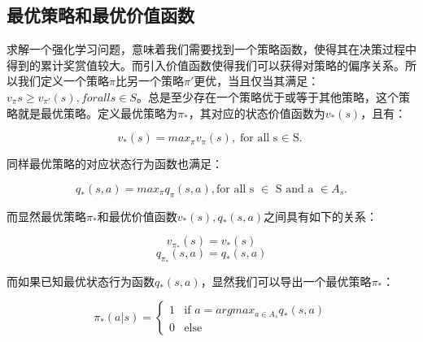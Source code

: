 \documentclass{standalone}
\begin{document}
\subsection{最优策略和最优价值函数}
求解一个强化学习问题，意味着我们需要找到一个策略函数，使得其在决策过程中得到的累计奖赏值较大。而引入价值函数使得我们可以获得对策略的偏序关系。所以我们定义一个策略$\pi$比另一个策略$\pi'$更优，当且仅当其满足：$v_{\pi}{}s \geq v_{\pi'}(s), for all s \in S$。总是至少存在一个策略优于或等于其他策略，这个策略就是最优策略。定义最优策略为$\pi_{*}$，其对应的状态价值函数为$v_{*}(s)$，且有：
\begin{center}
    \begin{equation}
        v_{*}(s) = max_{\pi}v_{\pi}(s),
        \mbox{for all s $\in$ S.}
    \end{equation}
\end{center}
同样最优策略的对应状态行为函数也满足：
\begin{center}
    \begin{equation}
        q_{*}(s, a) = max_{\pi}q_{\pi}(s, a),
        \mbox{for all s $\in$ S and a $\in A_s$.}
    \end{equation}
\end{center}
而显然最优策略$\pi_{*}$和最优价值函数$v_{*}(s), q_{*}(s, a)$之间具有如下的关系：
\begin{center}
    \begin{equation}
        v_{\pi_*}(s) = v_{*}(s)
    \end{equation}
    \begin{equation}
        q_{\pi_*}(s, a) = q_{*}(s, a)
    \end{equation}
\end{center}
而如果已知最优状态行为函数$q_{*}(s, a)$，显然我们可以导出一个最优策略$\pi_{*}$：
\begin{center}
    \begin{equation}
    \pi_{*}(a|s) = \begin{cases}
    1 &\mbox{if $a = argmax_{a \in A_s}q_{*}(s, a)$}\\
    0 &\mbox{else}
    \end{cases}
    \end{equation}
\end{center}
\end{document}
